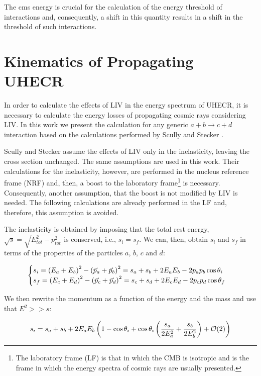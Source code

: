 \documentclass[a4paper]{jpconf}
\begin{document}
The cms energy is crucial for the calculation of the energy threshold of interactions and, consequently, a shift in this quantity results in a shift in the threshold of such interactions.

\section{Kinematics of Propagating UHECR}

In order to calculate the effects of LIV in the energy spectrum of UHECR, it is necessary to calculate the energy losses of propagating cosmic rays considering LIV. In this work we present the calculation for any generic $a + b \rightarrow c + d$ interaction based on the calculations performed by Scully and Stecker \cite{Scully2009}.

Scully and Stecker assume the effects of LIV only in the inelasticity, leaving the cross section unchanged. The same assumptions are used in this work. Their calculations for the inelasticity, however, are performed in the nucleus reference frame (NRF) and, then, a boost to the laboratory frame\footnote{The laboratory frame (LF) is that in which the CMB is isotropic and is the frame in which the energy spectra of cosmic rays are usually presented.} is necessary. Consequently, another assumption, that the boost is not modified by LIV is needed. The following calculations are already performed in the LF and, therefore, this assumption is avoided.

The inelasticity is obtained by imposing that the total rest energy, $\sqrt{s} = \sqrt{E^{2}_{tot} - p^{2}_{tot}}$ is conserved, i.e., $s_{i} = s_{f}$. We can, then, obtain $s_{i}$ and $s_{f}$ in terms of the properties of the particles $a$, $b$, $c$ and $d$:

\begin{equation}
\centering
\begin{cases}
s_{i} = \left(E_{a}+E_{b}\right)^{2} - \left(\vec{p}_{a}+\vec{p}_{b}\right)^{2} = s_{a} + s_{b} + 2 E_{a} E_{b} - 2 p_{a} p_{b} \cos{\theta_{i}} \\
s_{f} = \left(E_{c}+E_{d}\right)^{2} - \left(\vec{p}_{c}+\vec{p}_{d}\right)^{2} = s_{c} + s_{d} + 2 E_{c} E_{d} - 2 p_{c} p_{d} \cos{\theta_{f}}
\end{cases}
\end{equation}

We then rewrite the momentum as a function of the energy and the mass and use that $E^{2} >> s$:

\begin{equation}
\centering
s_{i} = s_{a} + s_{b} + 2 E_{a} E_{b} \left(1 - \cos{\theta_{i}} + \cos{\theta_{i}} \left(\frac{s_{a}}{2 E^{2}_{a}} + \frac{s_{b}}{2 E^{2}_{b}}\right) + \mathcal{O}(2) \right)
\end{equation}
\end{document}
